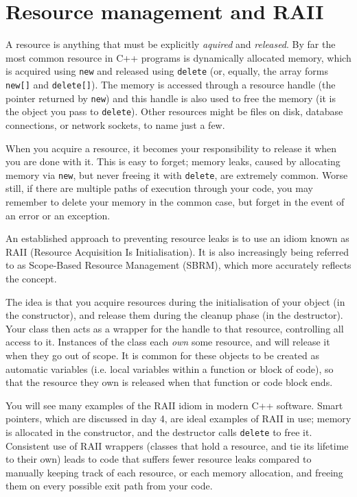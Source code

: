 \documentclass[a4paper]{scrartcl}
\begin{document}
\section{Resource management and RAII}
A resource is anything that must be explicitly \emph{aquired} and \emph{released}. By far the most common resource in C++ programs is dynamically allocated memory, which is acquired using \verb|new| and released using \verb|delete| (or, equally, the array forms \verb|new[]| and \verb|delete[]|). The memory is accessed through a resource handle (the pointer returned by \verb|new|) and this handle is also used to free the memory (it is the object you pass to \verb|delete|). Other resources might be files on disk, database connections, or network sockets, to name just a few.

When you acquire a resource, it becomes your responsibility to release it when you are done with it. This is easy to forget; memory leaks, caused by allocating memory via \verb|new|, but never freeing it with \verb|delete|, are extremely common. Worse still, if there are multiple paths of execution through your code, you may remember to delete your memory in the common case, but forget in the event of an error or an exception.

An established approach to preventing resource leaks is to use an idiom known as RAII (Resource Acquisition Is Initialisation). It is also increasingly being referred to as Scope-Based Resource Management (SBRM), which more accurately reflects the concept.

The idea is that you acquire resources during the initialisation of your object (in the constructor), and release them during the cleanup phase (in the destructor). Your class then acts as a wrapper for the handle to that resource, controlling all access to it. Instances of the class each \emph{own} some resource, and will release it when they go out of scope. It is common for these objects to be created as automatic variables (i.e. local variables within a function or block of code), so that the resource they own is released when that function or code block ends.

You will see many examples of the RAII idiom in modern C++ software. Smart pointers, which are discussed in day 4, are ideal examples of RAII in use; memory is allocated in the constructor, and the destructor calls \verb|delete| to free it. Consistent use of RAII wrappers (classes that hold a resource, and tie its lifetime to their own) leads to code that suffers fewer resource leaks compared to manually keeping track of each resource, or each memory allocation, and freeing them on every possible exit path from your code.
\end{document}
